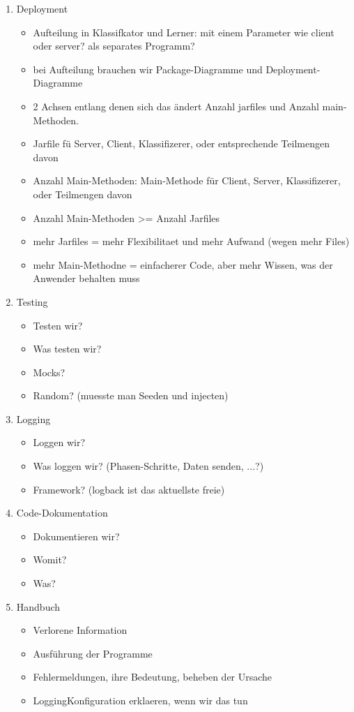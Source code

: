 \documentclass{article}
\begin{document}
\begin{enumerate}
\item Deployment
    \begin{itemize}
        \item Aufteilung in Klassifkator und Lerner: mit einem Parameter wie
              client oder server? als separates Programm?
        \item bei Aufteilung brauchen wir Package-Diagramme und Deployment-
              Diagramme
		\item 2 Achsen entlang denen sich das \"andert Anzahl jarfiles und Anzahl main-Methoden.
		\item Jarfile f\"u Server, Client, Klassifizerer, oder entsprechende Teilmengen davon
		\item Anzahl Main-Methoden: Main-Methode f\"ur Client, Server, Klassifizerer,
			  oder Teilmengen davon
		\item Anzahl Main-Methoden >= Anzahl Jarfiles
		\item mehr Jarfiles = mehr Flexibilitaet und mehr Aufwand (wegen mehr Files)
		\item mehr Main-Methodne = einfacherer Code, aber mehr Wissen, was der Anwender
			  behalten muss
    \end{itemize}

\item Testing
    \begin{itemize}
        \item Testen wir?
        \item Was testen wir?
        \item Mocks?
        \item Random? (muesste man Seeden und injecten)
    \end{itemize}

\item Logging
    \begin{itemize}
        \item Loggen wir?
        \item Was loggen wir? (Phasen-Schritte, Daten senden, ...?)
        \item Framework? (logback ist das aktuellste freie)
    \end{itemize}

\item Code-Dokumentation
    \begin{itemize}
        \item Dokumentieren wir?
        \item Womit?
        \item Was?
    \end{itemize}

\item Handbuch
    \begin{itemize}
        \item Verlorene Information
        \item Ausf\"uhrung der Programme
        \item Fehlermeldungen, ihre Bedeutung, beheben der Ursache
        \item LoggingKonfiguration erklaeren, wenn wir das tun
    \end{itemize}
\end{enumerate}
\end{document}
